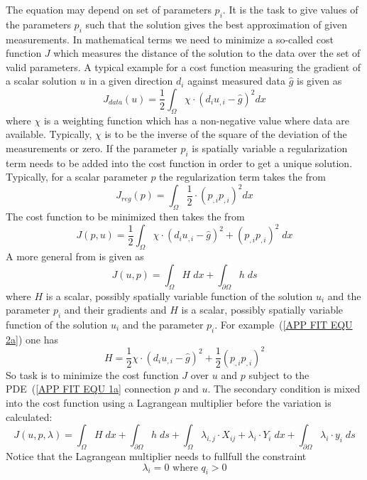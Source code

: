 The equation may depend on set of parameters $p_i$. It is the task to 
give values of the parameters $p_i$ such that the solution gives the best 
approximation of given measurements. In mathematical terms we need to minimize
a so-called cost function $J$ which measures the distance of the solution
to the data over the set of valid parameters. A typical example 
for a cost function measuring the gradient of a scalar solution $u$ 
in a given direction $d_i$ against measured data $\hat{g}$ is given as
\begin{equation}\label{APP FIT EQU 2a}
J_{data}(u) = \frac{1}{2}\int_{\Omega}  \chi \cdot ( d_i u_{,i} - \hat{g})^2 dx
\end{equation} 
where $\chi$ is a weighting function which has a non-negative value where data are available. 
Typically, $\chi$ is to be the inverse of the square of the deviation of the measurements or zero.
If the parameter $p_i$ is spatially variable a regularization term needs to be
added into the cost function in order to get a unique solution. Typically,
for a scalar parameter $p$ the regularization term takes the from
\begin{equation}\label{APP FIT EQU 3}
J_{reg}(p) =  \int_{\Omega} \frac{1}{2} \cdot (p_{,i}p_{,i})^{2} dx
\end{equation} 
The cost function to be minimized then takes the from
\begin{equation}\label{APP FIT EQU 2a}
J(p,u) = \frac{1}{2}\int_{\Omega}  \chi \cdot ( d_i u_{,i} - \hat{g})^2
+ (p_{,i}p_{,i})^{2} \;
dx
\end{equation} 
A more general from is given as 
\begin{equation}\label{APP FIT EQU 4}
J(u,p) = \int_{\Omega} H\; dx +  \int_{\partial \Omega} h \; ds
\end{equation} 
where $H$ is a scalar, possibly spatially variable  function 
of the solution $u_i$ and the parameter $p_i$ and their gradients
and  $H$ is a scalar, possibly spatially variable  function 
of the solution $u_i$ and the parameter $p_i$. For example~(\ref{APP FIT EQU 2a})
one has
\begin{equation}\label{APP FIT EQU 4a}
H = \frac{1}{2} \chi \cdot (d_i u_{,i} - \hat{g})^2 +  \frac{1}{2} (p_{,i}p_{,i})^{2} 
\end{equation} 
So task is to minimize the cost function $J$ over $u$ and $p$  
subject to the PDE~(\ref{APP FIT EQU 1a} connection $p$ and $u$. The secondary condition
is mixed into the cost function using a Lagrangean multiplier before the variation is calculated:
\begin{equation}\label{APP FIT EQU 5}
J(u,p,\lambda) = \int_{\Omega} H \; dx + \int_{\partial \Omega} h \; ds
+ \int_{\Omega} \lambda_{i,j} \cdot X_{ij} + \lambda_{i} \cdot Y_{i} \; dx
+ \int_{\partial \Omega}  \lambda_{i} \cdot y_{i} \; ds
\end{equation}
Notice that the Lagrangean multiplier needs to fullfull the constraint
\begin{equation} \label{APP FIT EQU 5b}
\lambda_{i}=0 \mbox{ where } q_i>0
\end{equation}

